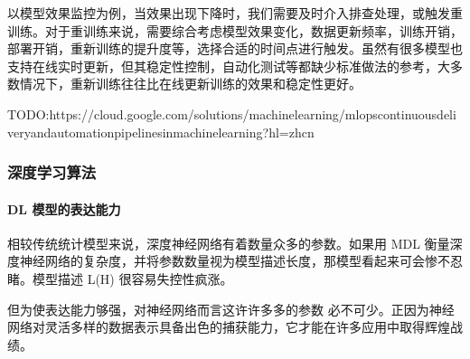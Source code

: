 \documentclass[letterpaper,11pt,english]{sphinxmanual}
\begin{document}
以模型效果监控为例，当效果出现下降时，我们需要及时介入排查处理，或触发重训练。对于重训练来说，需要综合考虑模型效果变化，数据更新频率，训练开销，部署开销，重新训练的提升度等，选择合适的时间点进行触发。虽然有很多模型也支持在线实时更新，但其稳定性控制，自动化测试等都缺少标准做法的参考，大多数情况下，重新训练往往比在线更新训练的效果和稳定性更好。

TODO:https://cloud.google.com/solutions/machine\sphinxhyphen{}learning/mlops\sphinxhyphen{}continuous\sphinxhyphen{}delivery\sphinxhyphen{}and\sphinxhyphen{}automation\sphinxhyphen{}pipelines\sphinxhyphen{}in\sphinxhyphen{}machine\sphinxhyphen{}learning?hl=zh\sphinxhyphen{}cn


\subsubsection{深度学习算法}
\label{\detokenize{chapter_AI_dive/DL:id1}}\label{\detokenize{chapter_AI_dive/DL::doc}}

\paragraph{DL 模型的表达能力}
\label{\detokenize{chapter_AI_dive/DL:dl}}
相较传统统计模型来说，深度神经网络有着数量众多的参数。如果用 MDL
衡量深度神经网络的复杂度，并将参数数量视为模型描述长度，那模型看起来可会惨不忍睹。模型描述
L(H) 很容易失控性疯涨。

但为使表达能力够强，对神经网络而言这许许多多的参数
必不可少。正因为神经网络对灵活多样的数据表示具备出色的捕获能力，它才能在许多应用中取得辉煌战绩。%
\begin{footnote}[846]\sphinxAtStartFootnote
{}
%
\end{footnote}
\end{document}
